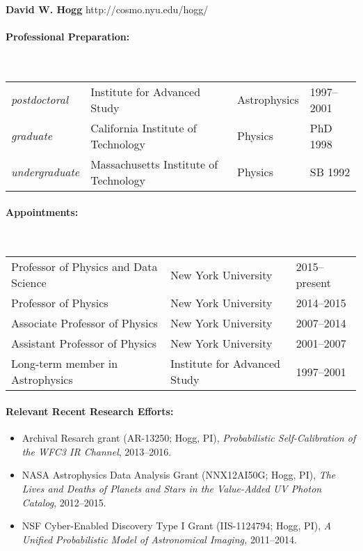 \documentclass[12pt]{article}
\begin{document}
\noindent
\textbf{David W. Hogg} \hfill http://cosmo.nyu.edu/hogg/

\paragraph{Professional Preparation:}~\\
\begin{tabular}{@{}llll}
\textsl{postdoctoral}
  & Institute for Advanced Study          & Astrophysics & 1997--2001\\
\textsl{graduate}
  & California Institute of Technology    & Physics & PhD 1998\\
\textsl{undergraduate}
  & Massachusetts Institute of Technology & Physics & SB 1992\\
\end{tabular}
           
\paragraph{Appointments:}~\\
\begin{tabular}{@{}lll}
Professor of Physics and Data Science & New York University & 2015--present \\
Professor of Physics                  & New York University & 2014--2015 \\
Associate Professor of Physics        & New York University & 2007--2014 \\
Assistant Professor of Physics        & New York University & 2001--2007 \\
Long-term member in Astrophysics      & Institute for Advanced Study & 1997--2001 \\
\end{tabular}

\paragraph{Relevant Recent Research Efforts:}
\begin{itemize}\setlength{\itemsep}{0pt}
\item
{} Archival Resarch grant (AR-13250; Hogg, PI),
\textit{Probabilistic Self-Calibration of the WFC3 IR Channel},
2013--2016.
\item
NASA Astrophysics Data Analysis Grant (NNX12AI50G; Hogg, PI),
\textit{The Lives and Deaths of Planets and Stars in the Value-Added UV Photon Catalog},
2012--2015.
\item
NSF Cyber-Enabled Discovery Type I Grant (IIS-1124794; Hogg, PI),
\textit{A Unified Probabilistic Model of Astronomical Imaging,}
2011--2014.
\end{itemize}
\end{document}
